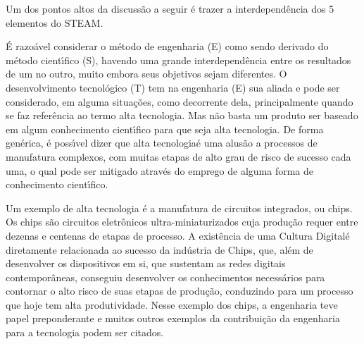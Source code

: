 \documentclass[
12pt,		%
openright,	%
twoside,  %
a4paper,			%
chapter=TITLE,		%
english,			%
french,				%
spanish,			%
brazil				%
]{USPSC-classe/USPSC}
\begin{document}
Um dos pontos altos da discuss\~ao a seguir \'e trazer a interdepend\^encia dos 5 elementos do STEAM.

















\'E razo\'avel considerar o m\'etodo de engenharia (E) como sendo derivado do m\'etodo cient\'{\i}fico (S), havendo uma grande interdepend\^encia entre os resultados de um no outro, muito embora seus objetivos sejam diferentes. O desenvolvimento tecnol\'ogico (T) tem na engenharia (E) sua aliada e pode ser considerado, em alguma situa\c{c}\~oes, como decorrente dela, principalmente quando se faz refer\^encia ao termo \textquotedbl alta tecnologia\textquotedbl . Mas n\~ao basta um produto ser baseado em algum conhecimento cient\'{\i}fico para que seja alta tecnologia. De forma gen\'erica, \'e poss\'{\i}vel dizer que \textquotedbl alta tecnologia\textquotedbl  \'e uma alus\~ao a processos de manufatura complexos, com muitas etapas de alto grau de risco de sucesso cada uma, o qual pode ser mitigado atrav\'es do emprego de alguma forma de conhecimento cient\'{\i}fico.

















Um exemplo de alta tecnologia \'e a manufatura de circuitos integrados, ou chips. Os chips s\~ao circuitos eletr\^onicos ultra-miniaturizados cuja produ\c{c}\~ao requer entre dezenas e centenas de etapas de processo. A exist\^encia de uma \textquotedbl Cultura Digital\textquotedbl  \'e diretamente relacionada ao sucesso da ind\'ustria de Chips, que, al\'em de desenvolver os dispositivos em si, que sustentam as redes digitais contempor\^aneas, conseguiu desenvolver os conhecimentos necess\'arios para contornar o alto risco de suas etapas de produ\c{c}\~ao, conduzindo para um processo que hoje tem alta produtividade. Nesse exemplo dos chips, a engenharia teve papel preponderante e muitos outros exemplos da contribui\c{c}\~ao da engenharia para a tecnologia podem ser citados.
\end{document}
